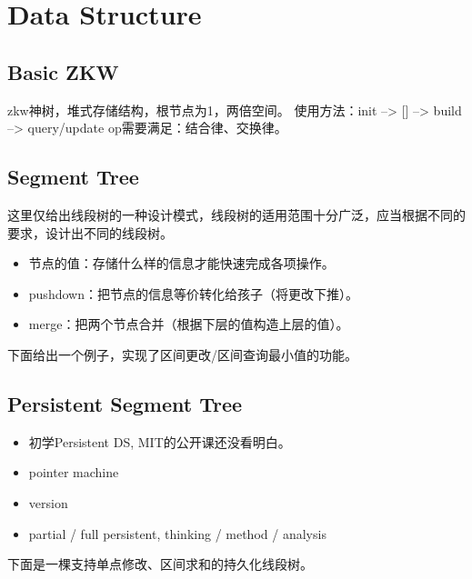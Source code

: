 \newpage
\section{Data Structure}
	\subsection{Basic ZKW}
		\begin{flushleft}
			zkw神树，堆式存储结构，根节点为1，两倍空间。
			\linebreak 使用方法：init --> [] --> build --> query/update
			\linebreak op需要满足：结合律、交换律。
		\end{flushleft}
		
	\newpage
	\subsection{Segment Tree}
		\begin{flushleft}
			这里仅给出线段树的一种设计模式，线段树的适用范围十分广泛，应当根据不同的要求，设计出不同的线段树。
			\begin{itemize}
				\item 节点的值：存储什么样的信息才能快速完成各项操作。
				\item pushdown：把节点的信息等价转化给孩子（将更改下推）。
				\item merge：把两个节点合并（根据下层的值构造上层的值）。
			\end{itemize}
			下面给出一个例子，实现了区间更改/区间查询最小值的功能。
		\end{flushleft}
		
	\newpage
	\subsection{Persistent Segment Tree}
		\begin{flushleft}
			\begin{itemize}
				\item 初学Persistent DS, MIT的公开课还没看明白。
				\item pointer machine
				\item version
				\item partial / full persistent, thinking / method / analysis
			\end{itemize}
			下面是一棵支持单点修改、区间求和的持久化线段树。
		\end{flushleft}
		
	\newpage
